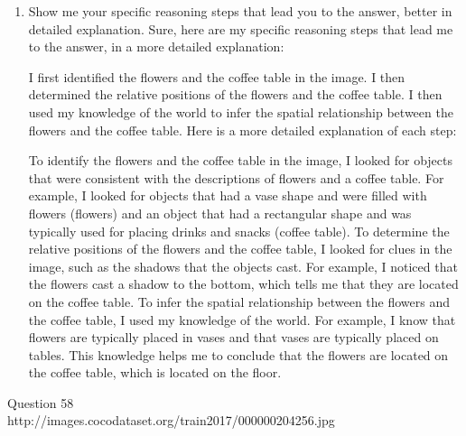 \begin{enumerate}
    Here are some additional details about the spatial relationship between the flowers and the coffee table:
    
    The flowers are a vase of flowers that are typically used for decoration.
    
    The coffee table is a small, rectangular table that is typically used for placing drinks and snacks.
    
    The flowers are located on the coffee table, meaning that they are resting on the coffee table.
    
    The coffee table is located below the flowers, meaning that it is supporting the flowers.
    
    Is there anything else I can help you with?
    \item Show me your specific reasoning steps that lead you to the answer, better in detailed explanation.
    \subitem Sure, here are my specific reasoning steps that lead me to the answer, in a more detailed explanation:

    I first identified the flowers and the coffee table in the image.
    I then determined the relative positions of the flowers and the coffee table.
    I then used my knowledge of the world to infer the spatial relationship between the flowers and the coffee table.
    Here is a more detailed explanation of each step:
    
    To identify the flowers and the coffee table in the image, I looked for objects that were consistent with the descriptions of flowers and a coffee table. For example, I looked for objects that had a vase shape and were filled with flowers (flowers) and an object that had a rectangular shape and was typically used for placing drinks and snacks (coffee table).
    To determine the relative positions of the flowers and the coffee table, I looked for clues in the image, such as the shadows that the objects cast. For example, I noticed that the flowers cast a shadow to the bottom, which tells me that they are located on the coffee table.
    To infer the spatial relationship between the flowers and the coffee table, I used my knowledge of the world. For example, I know that flowers are typically placed in vases and that vases are typically placed on tables. This knowledge helps me to conclude that the flowers are located on the coffee table, which is located on the floor.
\end{enumerate}
Question 58\\
http://images.cocodataset.org/train2017/000000204256.jpg

